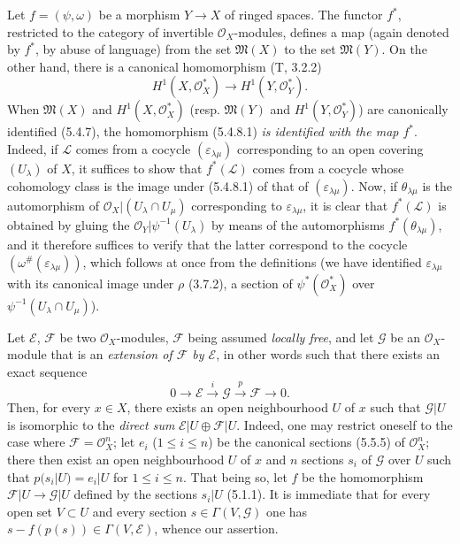 \begin{env}[5.4.8]
\label{0.5.4.8}
Let $f=(\psi,\omega)$ be a morphism $Y\to X$ of ringed spaces. The functor
$f^*$, restricted to the category of invertible $\mathcal{O}_X$-modules,
defines a map (again denoted by $f^*$, by abuse of language) from the set
$\mathfrak{M}(X)$ to the set $\mathfrak{M}(Y)$. On the other hand, there is a
canonical homomorphism (T, 3.2.2)
\[
  H^1(X,\mathcal{O}_X^*)\longrightarrow H^1(Y,\mathcal{O}_Y^*).
  \tag{5.4.8.1}\label{0.5.4.8.1}
\]
When $\mathfrak{M}(X)$ and
$H^1(X,\mathcal{O}_X^*)$ (resp. $\mathfrak{M}(Y)$ and
$H^1(Y,\mathcal{O}_Y^*)$) are canonically identified (5.4.7), the homomorphism (5.4.8.1) \emph{is identified with
the map $f^*$}. Indeed, if $\mathcal{L}$ comes from a cocycle
$(\varepsilon_{\lambda\mu})$ corresponding to an open covering
$(U_\lambda)$ of $X$, it suffices to show that $f^*(\mathcal{L})$ comes
from a cocycle whose cohomology class is the image under (5.4.8.1) of that of
$(\varepsilon_{\lambda\mu})$. Now, if $\theta_{\lambda\mu}$ is
the automorphism of $\mathcal{O}_X|(U_\lambda\cap U_\mu)$ corresponding to
$\varepsilon_{\lambda\mu}$, it is clear that $f^*(\mathcal{L})$ is obtained by
gluing the $\mathcal{O}_Y|\psi^{-1}(U_\lambda)$ by means of the
automorphisms $f^*(\theta_{\lambda\mu})$, and it therefore suffices to verify that
the latter correspond to the cocycle
$(\omega^\#(\varepsilon_{\lambda\mu}))$, which follows at once from the
definitions (we have identified $\varepsilon_{\lambda\mu}$ with its canonical image
under $\rho$ (3.7.2), a section of $\psi^*(\mathcal{O}_X^*)$ over
$\psi^{-1}(U_\lambda\cap U_\mu)$).
\end{env}

\begin{env}[5.4.9]
\label{0.5.4.9}
Let $\mathcal{E}$, $\mathcal{F}$ be two $\mathcal{O}_X$-modules,
$\mathcal{F}$ being assumed \emph{locally free}, and let $\mathcal{G}$ be an
$\mathcal{O}_X$-module that is an \emph{extension of $\mathcal{F}$ by $\mathcal{E}$},
in other words such that there exists an exact sequence
\[
  0\longrightarrow\mathcal{E}\xrightarrow{i}\mathcal{G}
  \xrightarrow{p}\mathcal{F}\longrightarrow 0.
\]
Then, for every $x\in X$, there exists an open neighbourhood $U$ of $x$ such that
$\mathcal{G}|U$ is isomorphic to the \emph{direct sum}
$\mathcal{E}|U\oplus\mathcal{F}|U$. Indeed, one may restrict oneself to the case where
$\mathcal{F}=\mathcal{O}_X^n$; let $e_i$ ($1\leq i\leq n$) be the canonical
sections (5.5.5) of $\mathcal{O}_X^n$; there then exist an open neighbourhood
$U$ of $x$ and $n$ sections $s_i$ of $\mathcal{G}$ over $U$ such that
$p(s_i|U)=e_i|U$ for $1\leq i\leq n$. That being so, let $f$ be
the homomorphism $\mathcal{F}|U\to\mathcal{G}|U$ defined by the sections
$s_i|U$ (5.1.1). It is immediate that for every open set $V\subset U$ and every
section $s\in\Gamma(V,\mathcal{G})$ one has
$s-f(p(s))\in\Gamma(V,\mathcal{E})$, whence our assertion.
\end{env}

